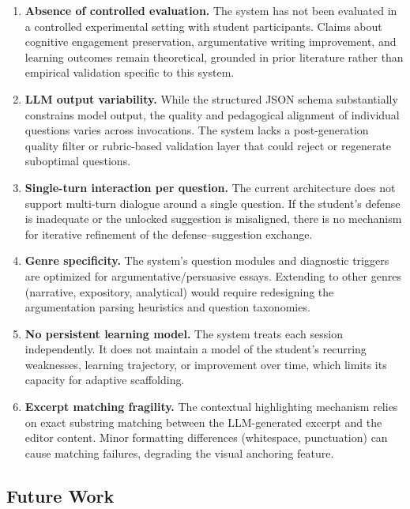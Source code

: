 \documentclass[11pt,a4paper]{article}
\begin{document}
\begin{enumerate}[leftmargin=*]
    \item \textbf{Absence of controlled evaluation.} The system has not been evaluated in a controlled experimental setting with student participants. Claims about cognitive engagement preservation, argumentative writing improvement, and learning outcomes remain theoretical, grounded in prior literature rather than empirical validation specific to this system.

    \item \textbf{LLM output variability.} While the structured JSON schema substantially constrains model output, the quality and pedagogical alignment of individual questions varies across invocations. The system lacks a post-generation quality filter or rubric-based validation layer that could reject or regenerate suboptimal questions.

    \item \textbf{Single-turn interaction per question.} The current architecture does not support multi-turn dialogue around a single question. If the student's defense is inadequate or the unlocked suggestion is misaligned, there is no mechanism for iterative refinement of the defense--suggestion exchange.

    \item \textbf{Genre specificity.} The system's question modules and diagnostic triggers are optimized for argumentative/persuasive essays. Extending to other genres (narrative, expository, analytical) would require redesigning the argumentation parsing heuristics and question taxonomies.

    \item \textbf{No persistent learning model.} The system treats each session independently. It does not maintain a model of the student's recurring weaknesses, learning trajectory, or improvement over time, which limits its capacity for adaptive scaffolding.

    \item \textbf{Excerpt matching fragility.} The contextual highlighting mechanism relies on exact substring matching between the LLM-generated excerpt and the editor content. Minor formatting differences (whitespace, punctuation) can cause matching failures, degrading the visual anchoring feature.
\end{enumerate}

\subsection{Future Work}
\end{document}
